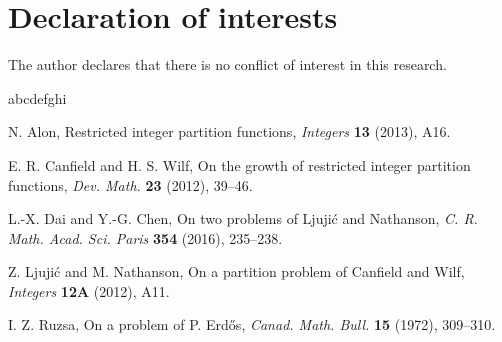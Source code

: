 \documentclass[12pt,a4paper,reqno]{amsart}
\numberwithin{equation}{section}
\theoremstyle{plain}
\theoremstyle{definition}
\begin{document}
\section*{Declaration of interests}
The author declares that there is no conflict of interest in this research.


\begin{thebibliography}{abcdefghi}

N. Alon, Restricted integer partition functions, {\it Integers} {\bf 13} (2013), A16.

E. R. Canfield and H. S. Wilf, On the growth of restricted integer partition functions, {\it Dev. Math.} {\bf 23} (2012), 39--46.

L.-X. Dai and Y.-G. Chen, On two problems of Ljuji\'c and Nathanson, {\it C. R. Math. Acad. Sci. Paris} {\bf 354} (2016), 235--238.

Z. Ljuji\'c and M. Nathanson, On a partition problem of Canfield and Wilf, {\it Integers} {\bf 12A} (2012), A11.


I. Z. Ruzsa, On a problem of P. Erd\H{o}s, {\it Canad. Math. Bull.} {\bf 15} (1972), 309--310.

\end{thebibliography}
\end{document}
